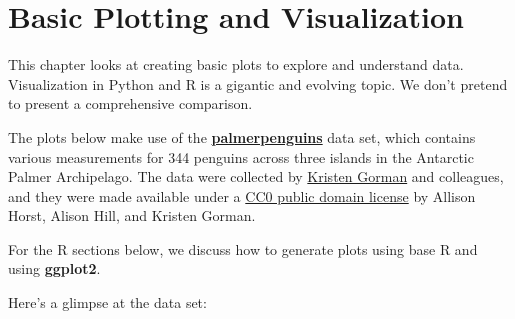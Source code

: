 \documentclass[
]{book}
\begin{document}
\hypertarget{basic-plotting-and-visualization}{%
\chapter{Basic Plotting and Visualization}\label{basic-plotting-and-visualization}}

This chapter looks at creating basic plots to explore and understand data. Visualization in Python and R is a gigantic and evolving topic. We don't pretend to present a comprehensive comparison.

The plots below make use of the \href{https://allisonhorst.github.io/palmerpenguins/}{\textbf{palmerpenguins}} data set, which contains various measurements for 344 penguins across three islands in the Antarctic Palmer Archipelago. The data were collected by \href{https://www.uaf.edu/cfos/people/faculty/detail/kristen-gorman.php}{Kristen Gorman} and colleagues, and they were made available under a \href{https://creativecommons.org/share-your-work/public-domain/cc0/}{CC0 public domain license} by Allison Horst, Alison Hill, and Kristen Gorman.

For the R sections below, we discuss how to generate plots using base R and using \textbf{ggplot2}.

Here's a glimpse at the data set:
\end{document}
